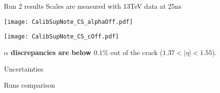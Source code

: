 \documentclass[a4paper]{beamer}
\begin{document}
\begin{frame}{Run 2 results}
  Scales are measured with 13TeV data at 25ns
  \begin{minipage}{0.49\linewidth} 
    \texttt{[image: CalibSupNote\_CS\_alphaOff.pdf]}
  \end{minipage}
  \hfill
  \begin{minipage}{0.49\linewidth}
    \texttt{[image: CalibSupNote\_CS\_cOff.pdf]}
  \end{minipage}
  {\bf $\alpha$  discrepancies are below $0.1\%$ } out of the crack ($1.37<|\eta|<1.55$).
\end{frame}
\begin{frame}{Uncertainties}
\end{frame}
\begin{frame}{Runs comparison}
\end{frame}
\end{document}
